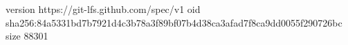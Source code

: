 version https://git-lfs.github.com/spec/v1
oid sha256:84a5331bd7b7921d4c3b78a3f89bf07b4d38ca3afad7f8ca9dd0055f290726bc
size 88301
